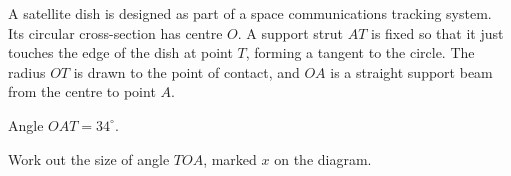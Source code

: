 \begin{question}
\noindent A satellite dish is designed as part of a space communications tracking system. Its circular cross-section has centre $O$. A support strut $AT$ is fixed so that it just touches the edge of the dish at point $T$, forming a tangent to the circle. The radius $OT$ is drawn to the point of contact, and $OA$ is a straight support beam from the centre to point $A$.

Angle $OAT = 34^\circ$.

\begin{center}
\end{center}

\noindent Work out the size of angle $TOA$, marked $x$ on the diagram.

\vspace{4cm}

\begin{flushright}
\end{flushright}
\end{question}
